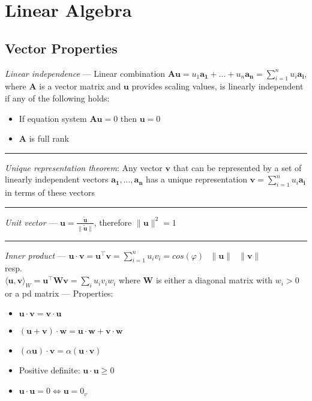 \section{Linear Algebra}
\subsection*{Vector Properties}
\emph{Linear independence} --- Linear combination $\boldsymbol{A}\boldsymbol{u} = u_1 \boldsymbol{a_1} + ... + u_n \boldsymbol{a_n} = \sum_{i=1}^n u_i \boldsymbol{a_i}$, where $\boldsymbol{A}$ is a vector matrix and $\boldsymbol{u}$ provides scaling values, is linearly independent if any of the following holds:
\begin{itemize}
    \item If equation system $\boldsymbol{A}\boldsymbol{u}=0$ then $\boldsymbol{u}=0$
    \item $\boldsymbol{A}$ is full rank
\end{itemize}

{\color{lightgray}\hrule height 0.001mm}

\emph{Unique representation theorem}: Any vector $\boldsymbol{v}$ that can be represented by a set of linearly independent vectors $\boldsymbol{a_1}, ..., \boldsymbol{a_n}$ has a unique representation $\boldsymbol{v} = \sum_{i=1}^n u_i \boldsymbol{a_i}$ in terms of these vectors
    
{\color{lightgray}\hrule height 0.001mm}

\emph{Unit vector} --- $\boldsymbol{u} = \frac{\boldsymbol{\tilde{u}}}{\|\boldsymbol{\tilde{u}}\|}$, therefore $\|\boldsymbol{u}\|^2 = 1$

{\color{lightgray}\hrule height 0.001mm}

\emph{Inner product} --- $\boldsymbol{u} \cdot \boldsymbol{v} = \boldsymbol{u}^\intercal\boldsymbol{v} = \sum_{i=1}^n u_i v_i = cos(\varphi) \textrm{ } \|\boldsymbol{u}\| \textrm{ } 
 \|\boldsymbol{v}\|$ \\
resp.\\
$\langle \boldsymbol{u}, \boldsymbol{v} \rangle_W = \boldsymbol{u}^\intercal \boldsymbol{W} \boldsymbol{v} = \sum_i u_i v_i w_i $ where $\boldsymbol{W}$ is either a diagonal matrix with $w_i > 0$ or a pd matrix --- 
Properties:
\begin{multicols}{2}
\begin{itemize}
    \item $\boldsymbol{u} \cdot \boldsymbol{v} = \boldsymbol{v} \cdot \boldsymbol{u}$
    \item $(\boldsymbol{u}+\boldsymbol{v}) \cdot \boldsymbol{w} = \boldsymbol{u} \cdot \boldsymbol{w} + \boldsymbol{v} \cdot \boldsymbol{w}$
    \item $(\alpha\boldsymbol{u}) \cdot \boldsymbol{v} = \alpha (\boldsymbol{u} \cdot \boldsymbol{v})$
    \item Positive definite: $\boldsymbol{u} \cdot \boldsymbol{u} \geq 0$
    \item $\boldsymbol{u} \cdot \boldsymbol{u} = 0 \Leftrightarrow \boldsymbol{u} = 0_v$
\end{itemize}
\end{multicols}

